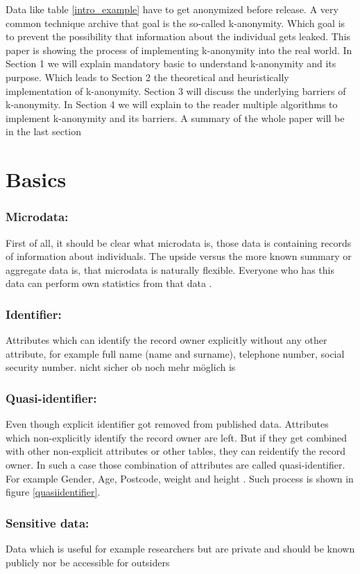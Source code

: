 \documentclass{llncs}
\begin{document}
Data like table \ref{intro_example} have to get anonymized before release. A very common
technique archive that goal is the so-called k-anonymity. Which goal is to prevent
the possibility that information about the individual gets leaked. This paper is
showing the process of implementing k-anonymity into the real world. In Section
1 we will explain mandatory basic to understand k-anonymity and its purpose.
Which leads to Section 2 the theoretical and heuristically implementation of
k-anonymity. Section 3 will discuss the underlying barriers of k-anonymity.
In Section 4 we will explain to the reader multiple algorithms to implement
k-anonymity and its barriers. A summary of the whole paper will be in the last section
\newpage
\section{Basics}
\subsubsection{Microdata:}
First of all, it should be clear what microdata is, those data is containing records of information about individuals. The upside versus the more known summary or aggregate data is, that microdata is naturally flexible. Everyone who has this data can perform own statistics from that data \cite{microdataweb}.
\subsubsection{Identifier:}
Attributes which can identify the record owner explicitly without any other attribute, for example full name (name and surname), telephone number, social security number. nicht sicher ob noch mehr möglich is\cite{domingo2008critique}
\subsubsection{Quasi-identifier:}
Even though explicit identifier got removed from published data. Attributes which non-explicitly identify the record owner are left. But if they get combined with other non-explicit attributes or other tables, they can reidentify the record owner. In such a case those combination of attributes are called quasi-identifier. For example Gender, Age, Postcode, weight and height \cite{dalenius1986finding}. Such process is shown in figure \ref{quasiidentifier}.
\subsubsection{Sensitive data:}
Data which is useful for example researchers but are private and should be known publicly nor be accessible for outsiders \cite{ldiversity}
\end{document}
